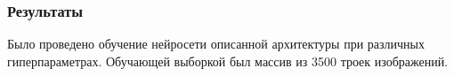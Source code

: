 \documentclass[9pt]{beamer}
\begin{document}
\begin{frame}\frametitle{Результаты}
	Было проведено обучение нейросети описанной архитектуры при различных гиперпараметрах. Обучающей выборкой был массив из 3500 троек изображений.
	\begin{figure}
		\begin{columns}
				\begin{minipage}{1\linewidth}
				\end{minipage}
				\vfill
				\begin{minipage}{1\linewidth}

\end{minipage}
\end{columns}
\end{figure}
\end{frame}
\end{document}
